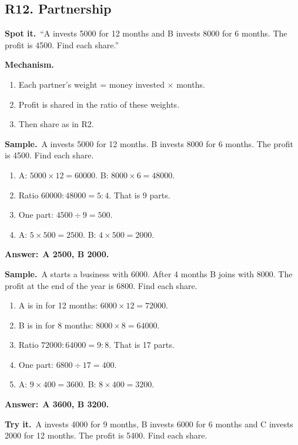 \documentclass[11pt,a4paper]{article}
\let\oldsubsection\subsection
\renewcommand{\subsection}{\needspace{9\baselineskip}\oldsubsection}
\newcommand{\spot}{\textbf{\color{ember}Spot it.}\ }
\newcommand{\mech}{\textbf{\color{ember}Mechanism.}\ }
\newif\ifkeepsamp
\newcommand{\ans}[1]{\par\nopagebreak\noindent\textbf{\color{ember}Answer:}\ \textbf{#1}\par}
\newcommand{\samp}{\ifkeepsamp\needspace{4\baselineskip}\fi\textbf{\color{ember}Sample.}\ }
\newcommand{\tryit}[1]{\textbf{\color{ember}Try it.}\ #1}
\begin{document}
\subsection{R12. Partnership}
\spot ``A invests 5000 for 12 months and B invests 8000 for 6 months. The profit is 4500. Find each share.''

\mech
\begin{enumerate}
\item Each partner's weight = money invested $\times$ months.
\item Profit is shared in the ratio of these weights.
\item Then share as in R2.
\end{enumerate}

\samp A invests 5000 for 12 months. B invests 8000 for 6 months. The profit is 4500. Find each share.
\begin{enumerate}
\item A: $5000 \times 12 = 60000$. B: $8000 \times 6 = 48000$.
\item Ratio $60000 : 48000 = 5 : 4$. That is 9 parts.
\item One part: $4500 \div 9 = 500$.
\item A: $5 \times 500 = 2500$. B: $4 \times 500 = 2000$.
\end{enumerate}
\ans{A 2500, B 2000.}

\samp A starts a business with 6000. After 4 months B joins with 8000. The profit at the end of the year is 6800. Find each share.
\begin{enumerate}
\item A is in for 12 months: $6000 \times 12 = 72000$.
\item B is in for 8 months: $8000 \times 8 = 64000$.
\item Ratio $72000 : 64000 = 9 : 8$. That is 17 parts.
\item One part: $6800 \div 17 = 400$.
\item A: $9 \times 400 = 3600$. B: $8 \times 400 = 3200$.
\end{enumerate}
\ans{A 3600, B 3200.}

\tryit A invests 4000 for 9 months, B invests 6000 for 6 months and C invests 2000 for 12 months. The profit is 5400. Find each share.
\end{document}
